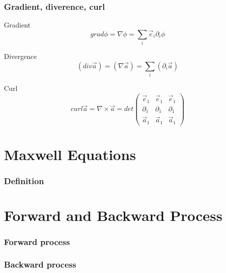 \documentclass{beamer}
\begin{document}
\begin{frame}
    \frametitle{Gradient, diverence, curl}

    \begin{block}{Gradient}
        \begin{equation}
            grad \phi = \nabla \phi = \sum_{i} \vec{e}_{i} \partial_{i} \phi
        \end{equation}
    \end{block}

    \begin{block}{Divergence}
        \begin{equation}
            (div \vec{a}) = (\nabla \vec{a}) = \sum_{i} (\partial_{i} \vec{a})
        \end{equation}
    \end{block}

    \begin{block}{Curl}
        \begin{equation}
            curl \vec{a} = \nabla \times \vec{a} = det
            \begin{pmatrix}
                \vec{e}_{1}  & \vec{e}_{1}  & \vec{e}_{1}  \\
                \partial_{1} & \partial_{1} & \partial_{1} \\
                \vec{a}_{1}  & \vec{a}_{1}  & \vec{a}_{1}
            \end{pmatrix}
        \end{equation}
    \end{block}

\end{frame}
\section{Maxwell Equations}

\begin{frame}
    \frametitle{Definition}
\end{frame}

\section{Forward and Backward Process}

\begin{frame}
    \frametitle{Forward process}
\end{frame}

\begin{frame}
    \frametitle{Backward process}
\end{frame}
\end{document}
